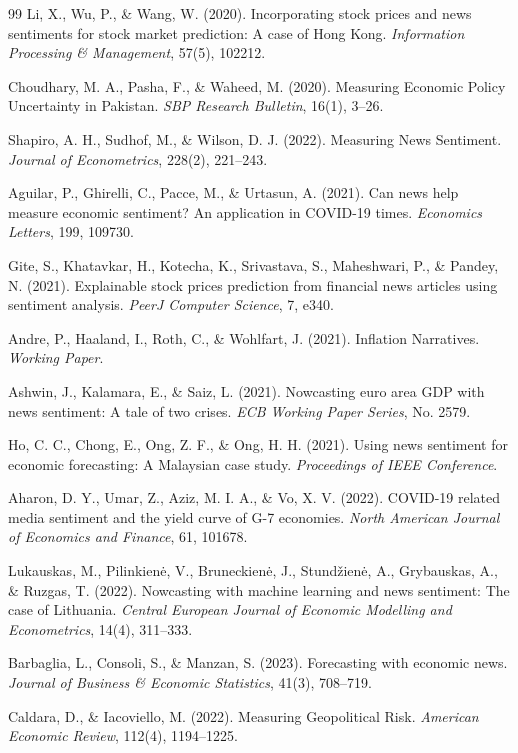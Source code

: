 \documentclass[11pt,twocolumn]{article}
\begin{document}
\begin{thebibliography}{99}
 Li, X., Wu, P., \& Wang, W. (2020). Incorporating stock prices and news sentiments for stock market prediction: A case of Hong Kong. \textit{Information Processing \& Management}, 57(5), 102212.

 Choudhary, M. A., Pasha, F., \& Waheed, M. (2020). Measuring Economic Policy Uncertainty in Pakistan. \textit{SBP Research Bulletin}, 16(1), 3--26.

 Shapiro, A. H., Sudhof, M., \& Wilson, D. J. (2022). Measuring News Sentiment. \textit{Journal of Econometrics}, 228(2), 221--243.

 Aguilar, P., Ghirelli, C., Pacce, M., \& Urtasun, A. (2021). Can news help measure economic sentiment? An application in COVID-19 times. \textit{Economics Letters}, 199, 109730.

 Gite, S., Khatavkar, H., Kotecha, K., Srivastava, S., Maheshwari, P., \& Pandey, N. (2021). Explainable stock prices prediction from financial news articles using sentiment analysis. \textit{PeerJ Computer Science}, 7, e340.

 Andre, P., Haaland, I., Roth, C., \& Wohlfart, J. (2021). Inflation Narratives. \textit{Working Paper}.

 Ashwin, J., Kalamara, E., \& Saiz, L. (2021). Nowcasting euro area GDP with news sentiment: A tale of two crises. \textit{ECB Working Paper Series}, No. 2579.

 Ho, C. C., Chong, E., Ong, Z. F., \& Ong, H. H. (2021). Using news sentiment for economic forecasting: A Malaysian case study. \textit{Proceedings of IEEE Conference}.

 Aharon, D. Y., Umar, Z., Aziz, M. I. A., \& Vo, X. V. (2022). COVID-19 related media sentiment and the yield curve of G-7 economies. \textit{North American Journal of Economics and Finance}, 61, 101678.

 Lukauskas, M., Pilinkienė, V., Bruneckienė, J., Stundžienė, A., Grybauskas, A., \& Ruzgas, T. (2022). Nowcasting with machine learning and news sentiment: The case of Lithuania. \textit{Central European Journal of Economic Modelling and Econometrics}, 14(4), 311--333.

 Barbaglia, L., Consoli, S., \& Manzan, S. (2023). Forecasting with economic news. \textit{Journal of Business \& Economic Statistics}, 41(3), 708--719.

 Caldara, D., \& Iacoviello, M. (2022). Measuring Geopolitical Risk. \textit{American Economic Review}, 112(4), 1194--1225.


\end{thebibliography}
\end{document}
